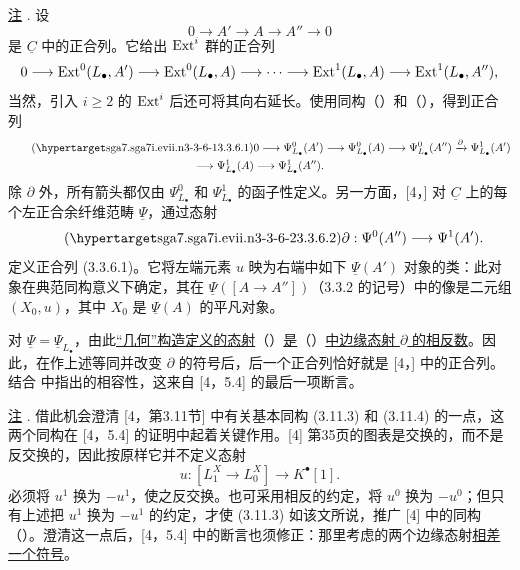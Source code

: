 \underline{注} . 设
\[
 0\longrightarrow A'\longrightarrow A\longrightarrow A''
 \longrightarrow0
\]
是 $\underline C$ 中的正合列。它给出 $\operatorname{Ext}^i$ 群的正合列
\[
 0\longrightarrow\operatorname{Ext}^0(L_\bullet,A')
 \longrightarrow\operatorname{Ext}^0(L_\bullet,A)
 \longrightarrow\cdots\longrightarrow\operatorname{Ext}^1(L_\bullet,A)
 \longrightarrow\operatorname{Ext}^1(L_\bullet,A''),
\]
当然，引入 $i\geq2$ 的 $\operatorname{Ext}^i$ 后还可将其向右延长。使用同构（）和（），得到正合列
\begin{multline}\tag{\SGARefTarget{sga7.sga7i.evii.n3-3-6-1}{3.3.6.1}}
 0\longrightarrow\Psi^0_{L_\bullet}(A')
 \longrightarrow\Psi^0_{L_\bullet}(A)
 \longrightarrow\Psi^0_{L_\bullet}(A'')
 \xrightarrow{\partial}\Psi^1_{L_\bullet}(A')\\
 \longrightarrow\Psi^1_{L_\bullet}(A)
 \longrightarrow\Psi^1_{L_\bullet}(A'').
\end{multline}
除 $\partial$ 外，所有箭头都仅由 $\Psi^0_{L_\bullet}$ 和 $\Psi^1_{L_\bullet}$ 的函子性定义。另一方面，[4，] 对 $\underline C$ 上的每个左正合余纤维范畴 $\underline\Psi$，通过态射
\begin{equation}\tag{\SGARefTarget{sga7.sga7i.evii.n3-3-6-2}{3.3.6.2}}
 \partial:\Psi^0(A'')\longrightarrow\Psi^1(A').
\end{equation}
定义正合列 (3.3.6.1)。它将左端元素 $u$ 映为右端中如下 $\underline\Psi(A')$ 对象的类：此对象在典范同构意义下确定，其在 $\underline\Psi([A\longrightarrow A''])$（3.3.2 的记号）中的像是二元组 $(X_0,u)$，其中 $X_0$ 是 $\underline\Psi(A)$ 的平凡对象。

对 $\underline\Psi=\underline\Psi_{L_\bullet}$，由此\underline{“几何”构造定义的态射}（）\underline{是}（）\underline{中边缘态射 $\partial$ 的相反数}。因此，在作上述等同并改变 $\partial$ 的符号后，后一个正合列恰好就是 [4，] 中的正合列。结合  中指出的相容性，这来自 [4，5.4] 的最后一项断言。

\underline{注} . 借此机会澄清 [4，第3.11节] 中有关基本同构 (3.11.3) 和 (3.11.4) 的一点，这两个同构在 [4，5.4] 的证明中起着关键作用。[4] 第35页的图表是交换的，而不是反交换的，因此按原样它并不定义态射
\[
 u:[L^X_1\longrightarrow L^X_0]\longrightarrow K^\bullet[1].
\]
必须将 $u^1$ 换为 $-u^1$，使之反交换。也可采用相反的约定，将 $u^0$ 换为 $-u^0$；但只有上述把 $u^1$ 换为 $-u^1$ 的约定，才使 (3.11.3) 如该文所说，推广 [4] 中的同构（）。澄清这一点后，[4，5.4] 中的断言也须修正：那里考虑的两个边缘态射\underline{相差一个符号}。

